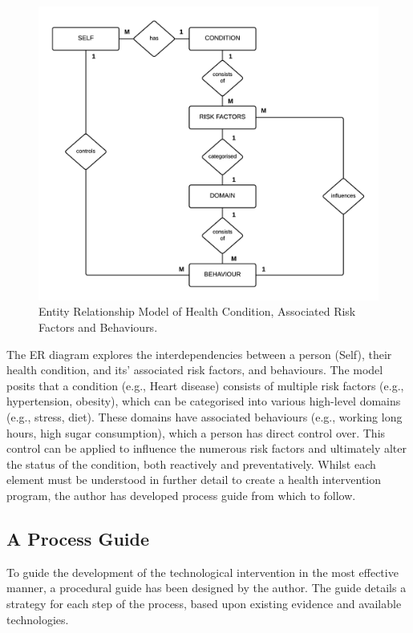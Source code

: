 \begin{figure}[h]
    \centering
    \includegraphics[scale=0.9, angle=0]{Files/prevention-study-1/figures/erd-riskfactors}
    \caption{Entity Relationship Model of Health Condition, Associated Risk Factors and Behaviours.}
    \label{fig: erd-model}
\end{figure}

The ER diagram explores the interdependencies between a person (Self), their health condition, and its' associated risk factors, and behaviours. The model posits that a condition (e.g., Heart disease) consists of multiple risk factors (e.g., hypertension, obesity), which can be categorised into various high-level domains (e.g., stress, diet). These domains have associated behaviours (e.g., working long hours, high sugar consumption), which a person has direct control over. This control can be applied to influence the numerous risk factors and ultimately alter the status of the condition, both reactively and preventatively.
Whilst each element must be understood in further detail to create a health intervention program, the author has developed process guide from which to follow.

\subsection{A Process Guide} \label{subsection: framework-process}
To guide the development of the technological intervention in the most effective manner, a procedural guide has been designed by the author. The guide details a strategy for each step of the process, based upon existing evidence and available technologies.

